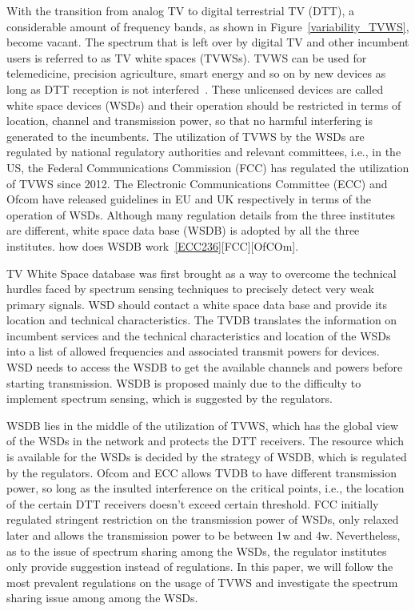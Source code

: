 \documentclass[times]{ettauth}
\newcommand{\ie}{i.e., }
\theoremstyle{mytheoremstyle}
\theoremstyle{mytheoremstyle}
\theoremstyle{mytheoremstyle}
\begin{document}
With the transition from analog TV to digital terrestrial TV (DTT), a considerable amount of frequency bands, as shown in Figure~\ref{variability_TVWS}, become vacant.
The spectrum that is left over by digital TV and other incumbent users is referred to as TV white spaces (TVWSs).
TVWS can be used for telemedicine, precision agriculture, smart energy and so on by new devices as long as DTT reception is not interfered~\cite{FCC_2010_sedond_memorandumm}. 
These unlicensed devices are called white space devices (WSDs) and their operation should be restricted in terms of location, channel and transmission power, so that no harmful interfering is generated to the incumbents.
The utilization of TVWS by the WSDs are regulated by national regulatory authorities and relevant committees, \ie in the US, the Federal Communications Commission (FCC) has regulated the utilization of TVWS since 2012. 
The Electronic Communications Committee (ECC) and Ofcom have released guidelines in EU and UK respectively in terms of the operation of WSDs.
Although many regulation details from the three institutes are different, white space data base (WSDB) is adopted by all the three institutes.
how does WSDB work~\ref{ECC236}[FCC][OfCOm].

TV White Space database was first brought as a way to overcome the technical hurdles faced by spectrum sensing techniques to precisely detect very weak primary signals.
WSD should contact a white space data base and provide its location and technical characteristics.
The TVDB translates the information on incumbent services and the technical characteristics and location of the WSDs into a list of allowed frequencies and associated transmit powers for devices.
WSD needs to access the WSDB to get the available channels and powers before starting transmission.
WSDB is proposed mainly due to the difficulty to implement spectrum sensing, which is suggested by the regulators.

WSDB lies in the middle of the utilization of TVWS, which has the global view of the WSDs in the network and protects the DTT receivers.
The resource which is available for the WSDs is decided by the strategy of WSDB, which is regulated by the regulators.
Ofcom and ECC allows TVDB to have different transmission power, so long as the insulted interference on the critical points, i.e., the location of the certain DTT receivers doesn’t exceed certain threshold.
FCC initially regulated stringent restriction on the transmission power of WSDs, only relaxed later and allows the transmission power to be between 1w and 4w.
%
Nevertheless, as to the issue of spectrum sharing among the WSDs, the regulator institutes only provide suggestion instead of regulations.
In this paper, we will follow the most prevalent regulations on the usage of TVWS and investigate the spectrum sharing issue among among the WSDs.
\end{document}
